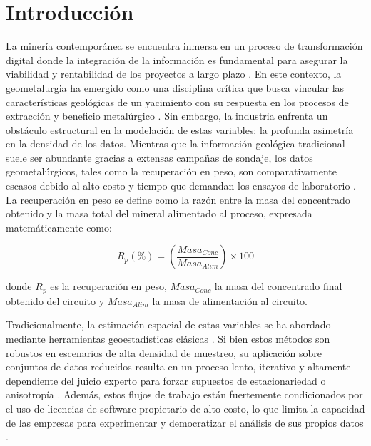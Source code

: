 \documentclass[12pt,letterpaper]{article}
\begin{document}
	\tableofcontents
	\newpage
	\listoffigures
	\newpage
	\listoftables
	\newpage
	
	
\section{Introducción}

	La minería contemporánea se encuentra inmersa en un proceso de transformación 
	digital donde la integración de la información es fundamental para asegurar la 
	viabilidad y rentabilidad de los proyectos a largo plazo \cite{Nwaila2024}. En este contexto, la 
	geometalurgia ha emergido como una disciplina crítica que busca vincular las 
	características geológicas de un yacimiento con su respuesta en los procesos 
	de extracción y beneficio metalúrgico \cite{Moreira2021}. Sin embargo, la industria enfrenta un 
	obstáculo estructural en la modelación de estas variables: la profunda asimetría 
	en la densidad de los datos. Mientras que la información geológica tradicional 
	suele ser abundante gracias a extensas campañas de sondaje, los datos 
	geometalúrgicos, tales como la recuperación en peso, son comparativamente 
	escasos debido al alto costo y tiempo que demandan los ensayos de laboratorio \cite{Jia2018}. 
	La recuperación en peso se define como la razón entre la masa del concentrado 
	obtenido y la masa total del mineral alimentado al proceso, expresada 
	matemáticamente como:
	
	\begin{equation}
		R_p (\%) = \left( \frac{Masa_{Conc}}{Masa_{Alim}} \right) \times 100
	\end{equation}
	
	donde $R_p$ es la recuperación en peso, $Masa_{Conc}$ la masa del concentrado 
	final obtenido del circuito y $Masa_{Alim}$ la masa de alimentación al circuito.
	
	Tradicionalmente, la estimación espacial de estas variables se ha abordado 
	mediante herramientas geoestadísticas clásicas \cite{Garnier2022}. Si bien estos métodos son 
	robustos en escenarios de alta densidad de muestreo, su aplicación sobre 
	conjuntos de datos reducidos resulta en un proceso lento, iterativo y altamente 
	dependiente del juicio experto para forzar supuestos de estacionariedad \cite{Emery2007} o anisotropía \cite{Mery2024}. Además, estos flujos de trabajo están fuertemente condicionados 
	por el uso de licencias de software propietario de alto costo, lo que limita 
	la capacidad de las empresas para experimentar y democratizar el análisis de 
	sus propios datos \cite{Nwaila2024}.
	
\end{document}
